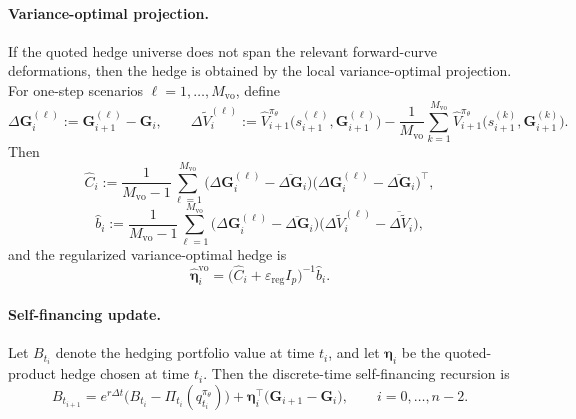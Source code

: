 \documentclass[10pt,a4paper,reqno]{amsart}
\newcommand{\<}{\langle}
\renewcommand{\>}{\rangle}
\theoremstyle{example}
\begin{document}
\paragraph{Variance-optimal projection.}
If the quoted hedge universe does not span the relevant forward-curve deformations, then the hedge is
obtained by the local variance-optimal projection. For one-step scenarios
$\ell=1,\dots,M_{\mathrm{vo}}$, define
\[
\Delta \mathbf{G}_i^{(\ell)}
:=
\mathbf{G}_{i+1}^{(\ell)}-\mathbf{G}_i,
\qquad
\Delta \widetilde V_i^{(\ell)}
:=
\widehat{V}_{i+1}^{\pi_\theta}\!\big(s_{i+1}^{(\ell)},\mathbf{G}_{i+1}^{(\ell)}\big)
-
\frac{1}{M_{\mathrm{vo}}}
\sum_{k=1}^{M_{\mathrm{vo}}}
\widehat{V}_{i+1}^{\pi_\theta}\!\big(s_{i+1}^{(k)},\mathbf{G}_{i+1}^{(k)}\big).
\]
Then
\begin{equation}
\label{eq:vo_cov_est_impl}
\widehat{C}_i
:=
\frac{1}{M_{\mathrm{vo}}-1}
\sum_{\ell=1}^{M_{\mathrm{vo}}}
\big(\Delta \mathbf{G}_i^{(\ell)}-\overline{\Delta \mathbf{G}}_i\big)
\big(\Delta \mathbf{G}_i^{(\ell)}-\overline{\Delta \mathbf{G}}_i\big)^\top,
\end{equation}
\begin{equation}
\label{eq:vo_cross_est_impl}
\widehat{b}_i
:=
\frac{1}{M_{\mathrm{vo}}-1}
\sum_{\ell=1}^{M_{\mathrm{vo}}}
\big(\Delta \mathbf{G}_i^{(\ell)}-\overline{\Delta \mathbf{G}}_i\big)
\big(\Delta \widetilde V_i^{(\ell)}-\overline{\Delta \widetilde V}_i\big),
\end{equation}
and the regularized variance-optimal hedge is
\begin{equation}
\label{eq:vo_hedge_impl}
\widehat{\boldsymbol{\eta}}_i^{\mathrm{vo}}
=
\big(\widehat{C}_i+\varepsilon_{\mathrm{reg}} I_p\big)^{-1}\widehat{b}_i.
\end{equation}

\paragraph{Self-financing update.}
Let $B_{t_i}$ denote the hedging portfolio value at time $t_i$, and let
$\boldsymbol{\eta}_i$ be the quoted-product hedge chosen at time $t_i$. Then the discrete-time
self-financing recursion is
\begin{equation}
\label{eq:self_financing_impl}
B_{t_{i+1}}
=
e^{r\Delta t}
\Big(
B_{t_i} - \Pi_{t_i}(q_{t_i}^{\pi_\theta})
\Big)
+
\boldsymbol{\eta}_i^\top
\big(
\mathbf{G}_{i+1}-\mathbf{G}_i
\big),
\qquad i=0,\dots,n-2.
\end{equation}
\end{document}
